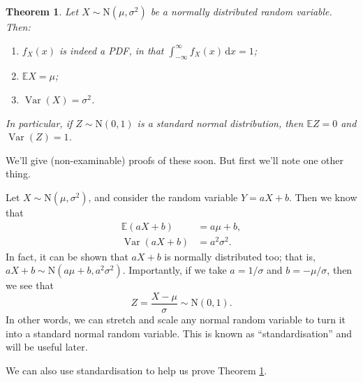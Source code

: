 \documentclass[
  a4paper,
]{book}
\providecommand{\tightlist}{%
  \setlength{\itemsep}{0pt}\setlength{\parskip}{0pt}}
\newtheorem{theorem}{Theorem}[chapter]
\theoremstyle{definition}
\theoremstyle{definition}
\theoremstyle{definition}
\theoremstyle{definition}
\theoremstyle{remark}
\begin{document}
\begin{theorem}
\protect\hypertarget{thm:norm-prop}{}\label{thm:norm-prop}Let \(X \sim \mathrm{N}(\mu, \sigma^2)\) be a normally distributed random variable. Then:

\begin{enumerate}
\def\labelenumi{\arabic{enumi}.}
\tightlist
\item
  \(f_X(x)\) is indeed a PDF, in that \(\displaystyle\int_{-\infty}^\infty f_X(x)\,\mathrm dx = 1\);
\item
  \(\mathbb EX = \mu\);
\item
  \(\operatorname{Var}(X) = \sigma^2\).
\end{enumerate}

In particular, if \(Z \sim \mathrm{N}(0, 1)\) is a standard normal distribution, then \(\mathbb EZ = 0\) and \(\operatorname{Var}(Z) = 1\).
\end{theorem}

We'll give (non-examinable) proofs of these soon. But first we'll note one other thing.

Let \(X \sim \mathrm{N}(\mu, \sigma^2)\), and consider the random variable \(Y = aX + b\). Then we know that
\begin{align*}
\mathbb E(aX + b) &= a\mu + b , \\
\operatorname{Var}(aX + b) &= a^2 \sigma^2 .
\end{align*}
In fact, it can be shown that \(aX + b\) is normally distributed too; that is, \(aX + b \sim \mathrm{N}(a\mu + b, a^2 \sigma^2)\). Importantly, if we take \(a = 1/\sigma\) and \(b = -\mu/\sigma\), then we see that
\[ Z = \frac{X - \mu}{\sigma} \sim \text{N} (0, 1) . \]
In other words, we can stretch and scale any normal random variable to turn it into a standard normal random variable. This is known as ``standardisation'' and will be useful later.

We can also use standardisation to help us prove Theorem \ref{thm:norm-prop}.
\end{document}
